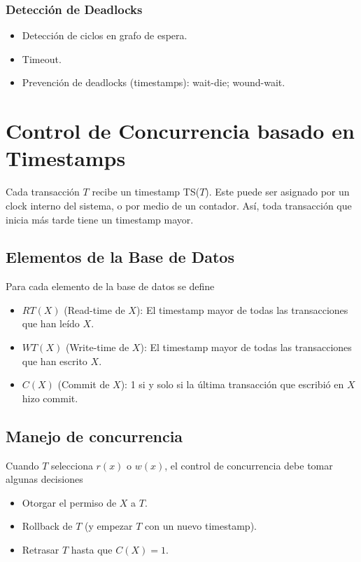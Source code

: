 
\subsubsection{Detección de Deadlocks}
\begin{itemize}
  \item Detección de ciclos en grafo de espera.
  \item Timeout.
  \item Prevención de deadlocks (timestamps): wait-die; wound-wait.
\end{itemize}



\section{Control de Concurrencia basado en Timestamps}
Cada transacción $T$ recibe un timestamp TS($T$). Este puede ser asignado por un clock interno del sistema, o por medio de un contador. Así, toda transacción que inicia más tarde tiene un timestamp mayor.

\subsection{Elementos de la Base de Datos}
Para cada elemento de la base de datos se define
\begin{itemize}
  \item $RT(X)$ (Read-time de $X$): El timestamp mayor de todas las transacciones que han leído $X$.
  \item $WT(X)$ (Write-time de $X$): El timestamp mayor de todas las transacciones que han escrito $X$.
  \item $C(X)$ (Commit de $X$): 1 si y solo si la última transacción que escribió en $X$ hizo commit.
\end{itemize}

\subsection{Manejo de concurrencia}
Cuando $T$ selecciona $r(x)$ o $w(x)$, el control de concurrencia debe tomar algunas decisiones
\begin{itemize}
  \item Otorgar el permiso de $X$ a $T$.
  \item Rollback de $T$ (y empezar $T$ con un nuevo timestamp).
  \item Retrasar $T$ hasta que $C(X) = 1$.
\end{itemize}

